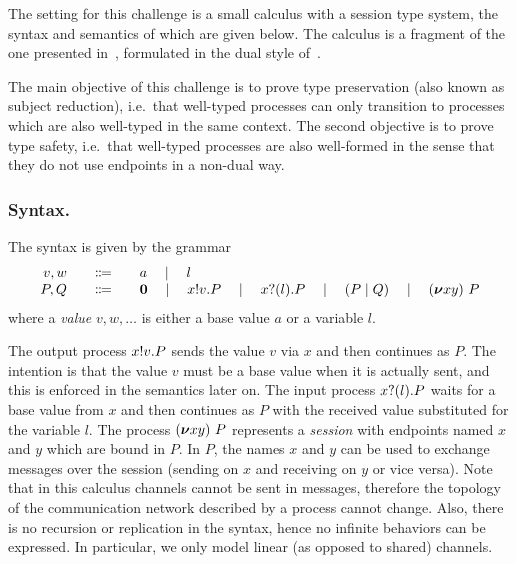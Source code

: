 \documentclass[runningheads]{llncs}
\begin{document}
The setting for this challenge is a small calculus with a session type
system, the syntax and semantics of which are given below. The
calculus is a fragment of the one presented in~\cite{Vasconcelos2012},
formulated in the dual style of~\cite{barber96tr}.

The main objective of this challenge is to prove type preservation (also
known as subject reduction), i.e.\ that well-typed
processes can only transition to processes which are also well-typed
in the same context.
The second objective is to prove type safety, i.e.\ that well-typed processes are also well-formed in the sense that they do not use endpoints in a non-dual way.

\subsubsection{Syntax.}
The syntax is given by the grammar
\[
\begin{array}{r@{\qquad}c@{\qquad}l}
  v,w & \Coloneqq & a \quad\mid\quad l \\
   P,Q & \Coloneqq & \Pend \quad\mid\quad \Pout{x}{v}{P} \quad\mid\quad \Pin{x}{l}{P} \quad\mid\quad \PBpar{P}{Q} \quad\mid\quad  \Presd{x}{y}{P}
\end{array}
\]
where a \emph{value} \( v, w, \dots \) is either a base value \( a \) or a variable \( l \).

The output process \( x ! v . P \) sends the value \( v \) via \( x \) and then continues as \( P \).
The intention is that the value \( v \) must be a base value when it is actually sent, and this is enforced in the semantics later on.
The input process \( x ? (l) . P \) waits for a base value from \( x \) and then continues as \( P \) with the received value substituted for the variable \( l \).
%
The process \( (\bm{\nu} xy)~P \) represents a \emph{session} with endpoints named \( x \) and \( y \) which are bound in \( P \). In \( P \), the names \( x \) and \( y \) can be used to exchange messages over the session (sending on \( x \) and receiving on \( y \) or vice versa).
%
%
Note that in this calculus channels cannot be sent in messages, therefore the topology of the communication network described by a process cannot change.
Also, there is no recursion or replication in the syntax, hence no infinite behaviors can be expressed. In particular, we only model linear (as opposed to shared) channels.
\end{document}
